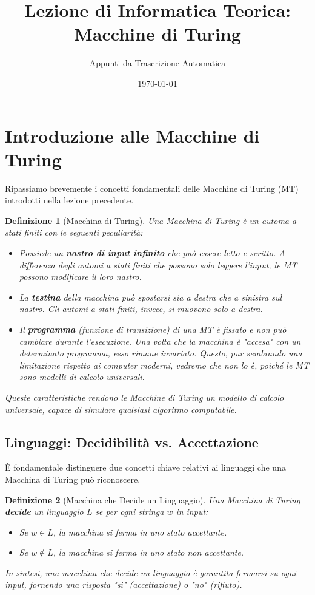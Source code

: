 \documentclass[a4paper]{article}
\title{Lezione di Informatica Teorica: Macchine di Turing}
\author{Appunti da Trascrizione Automatica}
\date{\today}
\newtheorem{definition}{Definizione}
\begin{document}
\maketitle
\tableofcontents
\newpage

\section{Introduzione alle Macchine di Turing}

Ripassiamo brevemente i concetti fondamentali delle Macchine di Turing (MT) introdotti nella lezione precedente.

\begin{definition}[Macchina di Turing]
Una Macchina di Turing è un automa a stati finiti con le seguenti peculiarità:
\begin{itemize}
    \item Possiede un \textbf{nastro di input infinito} che può essere letto e scritto. A differenza degli automi a stati finiti che possono solo leggere l'input, le MT possono modificare il loro nastro.
    \item La \textbf{testina} della macchina può spostarsi sia a destra che a sinistra sul nastro. Gli automi a stati finiti, invece, si muovono solo a destra.
    \item Il \textbf{programma} (funzione di transizione) di una MT è fissato e non può cambiare durante l'esecuzione. Una volta che la macchina è "accesa" con un determinato programma, esso rimane invariato. Questo, pur sembrando una limitazione rispetto ai computer moderni, vedremo che non lo è, poiché le MT sono modelli di calcolo universali.
\end{itemize}
Queste caratteristiche rendono le Macchine di Turing un modello di calcolo universale, capace di simulare qualsiasi algoritmo computabile.
\end{definition}

\subsection{Linguaggi: Decidibilità vs. Accettazione}

È fondamentale distinguere due concetti chiave relativi ai linguaggi che una Macchina di Turing può riconoscere.

\begin{definition}[Macchina che Decide un Linguaggio]
Una Macchina di Turing \textbf{decide} un linguaggio $L$ se per ogni stringa $w$ in input:
\begin{itemize}
    \item Se $w \in L$, la macchina si ferma in uno stato accettante.
    \item Se $w \notin L$, la macchina si ferma in uno stato non accettante.
\end{itemize}
In sintesi, una macchina che decide un linguaggio è garantita fermarsi su ogni input, fornendo una risposta "sì" (accettazione) o "no" (rifiuto).
\end{definition}
\end{document}
